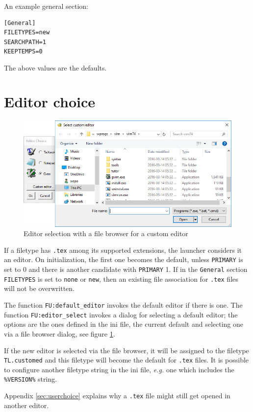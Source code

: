 \documentclass[11pt,a4paper,oneside]{report}
\begin{document}
An example general section:
\begin{verbatim}
[General]
FILETYPES=new
SEARCHPATH=1
KEEPTEMPS=0
\end{verbatim}
The above values are the defaults.

\section{Editor choice}
\label{sec:edsel}

\begin{figure}
  \centering
  \includegraphics[width=.8\linewidth]{figures/custom_ed}
  \caption{Editor selection with a file browser for a custom editor}
  \label{fig:ed_sel}
\end{figure}
If a filetype has \texttt{.tex} among its supported extensions, the
launcher considers it an editor. On initialization, the first one
becomes the default, unless \texttt{PRIMARY} is set to 0 and there
is another candidate with \texttt{PRIMARY} 1. If in the
\texttt{General} section \texttt{FILETYPES} is set to \texttt{none}
or \texttt{new}, then an existing file association for \texttt{.tex}
files will not be overwritten.

The function \texttt{FU:default\_editor} invokes the default editor
if there is one. The function \texttt{FU:editor\_select} invokes a
dialog for selecting a default editor; the options are the ones
defined in the ini file, the current default and selecting one via a
file browser dialog, see figure \ref{fig:ed_sel}.

If the new editor is selected via the file browser, it will be
assigned to the filetype \texttt{TL.customed} and this filetype will
become the default for \texttt{.tex} files.  It is possible to
configure another filetype string in the ini file, \emph{e.g.} one
which includes the \texttt{\%VERSION\%} string.

Appendix \ref{sec:userchoice} explains why a \texttt{.tex} file
might still get opened in another editor.
\end{document}
